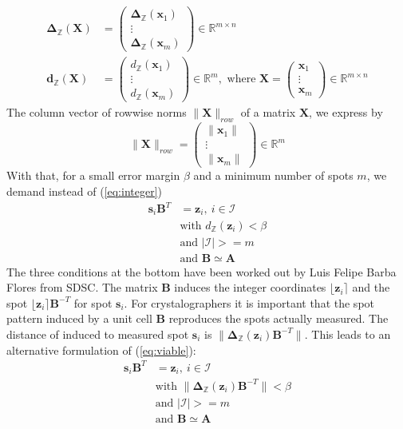 \documentclass[a4paper,10pt]{article}
\newcommand{\vect}[1]{\mathbf{#1}}
\newcommand{\mat}[1]{\mathbf{#1}}
\newcommand{\round}[1]{\lfloor #1 \rceil}
\newcommand{\distZ}[1]{d_\mathbb{Z}(#1)}
\newcommand{\distvecZ}[1]{\vect{d}_\mathbb{Z}(#1)}
\newcommand{\diffvecZ}[1]{\vect{\Delta}_\mathbb{Z}(#1)}
\begin{document}
%
\[
 \begin{split}
  \diffvecZ{\mat{X}} &= \begin{pmatrix} \diffvecZ{\vect{x}_1} \\ \vdots \\ \diffvecZ{\vect{x}_m} \end{pmatrix}\in \mathbb{R}^{m\times n} \\
  \distvecZ{\mat{X}} &= \begin{pmatrix} \distZ{\vect{x}_1} \\ \vdots \\ \distZ{\vect{x}_m} \end{pmatrix}\in \mathbb{R}^m,
     \text{ where }\mat{X} = \begin{pmatrix} \vect{x}_1 \\ \vdots \\ \vect{x}_m \end{pmatrix}\in \mathbb{R}^{m\times n}
 \end{split}
\]
%
The column vector of rowwise norms $\|\mat{X}\|_{row}$ of a matrix $\mat{X}$, we express by
%
\[
 \|\mat{X}\|_{row} = \begin{pmatrix} \|\vect{x}_1\| \\ \vdots \\ \|\vect{x}_m\| \end{pmatrix}\in \mathbb{R}^m
\]
%
With that, for a small error margin $\beta$ and a minimum number of spots $m$, we demand instead of (\ref{eq:integer})
%
\begin{equation}\label{eq:viable}
 \begin{split}
  \vect{s}_i \mat{B}^T &= \vect{z}_i,\ i \in \mathcal{I} \\
  &\text{with }\distZ{\vect{z}_i} < \beta \\
  &\text{and }|\mathcal{I}| >= m \\
  &\text{and }\mat{B} \simeq \mat{A}
 \end{split}
\end{equation}
%
The three conditions at the bottom have been worked out by Luis Felipe Barba Flores from SDSC. The matrix $\mat{B}$ induces the integer coordinates $\round{\vect{z}_i}$ and the spot $\round{\vect{z}_i}\mat{B}^{-T}$ for spot $\vect{s}_i$. For crystalographers it is important that the spot pattern induced by a unit cell $\mat{B}$ reproduces the spots actually measured. The distance of induced to measured spot $\vect{s}_i$ is $\|\diffvecZ{\vect{z}_i}\mat{B}^{-T}\|$. This leads to an alternative formulation of (\ref{eq:viable}):
%
\begin{equation}\label{eq:viable-reciprocal}
 \begin{split}
  \vect{s}_i \mat{B}^T &= \vect{z}_i,\ i \in \mathcal{I} \\
  &\text{with }\|\diffvecZ{\vect{z}_i}\mat{B}^{-T}\| < \beta \\
  &\text{and }|\mathcal{I}| >= m \\
  &\text{and }\mat{B} \simeq \mat{A}
 \end{split}
\end{equation}
\end{document}
